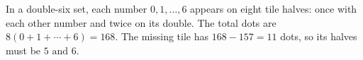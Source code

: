 In a double-six set, each number $0,1,\ldots,6$ appears on eight tile halves: once with each other number and twice on its double. The total dots are $8(0+1+\cdots+6)=168$. The missing tile has $168-157=11$ dots, so its halves must be $\boxed5\text{ and }\boxed6$.
